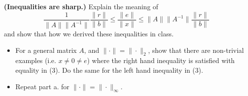 \textbf{(Inequalities are sharp.)} Explain the meaning of \[
\frac{1} {\|A\| \|A^{-1}\|}
\frac{\|r\|} {\|b\|}
\le
\frac{\|e\|}{\|x\|}
\le
\|A\| \|A^{-1}\|
\frac{\|r\|} {\|b\|}
\] and show that how we derived these inequalities in class.

\begin{itemize}
\item For a general matrix $A$, and $\| \cdot \| = \| \cdot \|_2$,
  show that there are non-trivial examples (i.e. $x \ne 0 \ne e$)
  where the right hand inequality is satisfied with equality in (3).
  Do the same for the left hand inequality in (3).
\item Repeat part a. for $\| \cdot \| = \| \cdot \|_\infty$.
\end{itemize}
